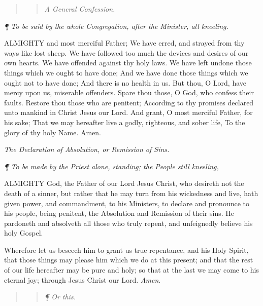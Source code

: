 \begin{quote}

\begin{quote}

\emph{A
General Confession.}

\end{quote}

\end{quote}

\emph{¶
To be said by the whole Congregation, after the Minister, all kneeling.}

ALMIGHTY
and most merciful Father; We have erred, and strayed from thy ways like
lost sheep. We have followed too much the devices and desires of our own
hearts. We have offended against thy holy laws. We have left undone those
things which we ought to have done; And we have done those things which
we ought not to have done; And there is no health in us. But thou, O Lord,
have mercy upon us, miserable offenders. Spare thou those, O God, who
confess their faults. Restore thou those who are penitent; According to
thy promises declared unto mankind in Christ Jesus our Lord. And grant,
O most merciful Father, for his sake; That we may hereafter live a godly,
righteous, and sober life, To the glory of thy holy Name. Amen.

\emph{The
Declaration of Absolution, or Remission of Sins.}

\emph{¶
To be made by the Priest alone, standing; the People still kneeling,}

ALMIGHTY
God, the Father of our Lord Jesus Christ, who desireth not the death of
a sinner, but rather that he may turn from his wickedness and live, hath
given power, and commandment, to his Ministers, to declare and pronounce
to his people, being penitent, the Absolution and Remission of their sins.
He pardoneth and absolveth all those who truly repent, and unfeignedly
believe his holy Gospel.

Wherefore let us beseech him to grant us true repentance,
and his Holy Spirit, that those things may please him which we do at this
present; and that the rest of our life hereafter may be pure and holy;
so that at the last we may come to his eternal joy; through Jesus Christ
our Lord. \emph{Amen}.

\begin{quote}

\begin{quote}

\emph{¶
Or this.}

\end{quote}

\end{quote}

